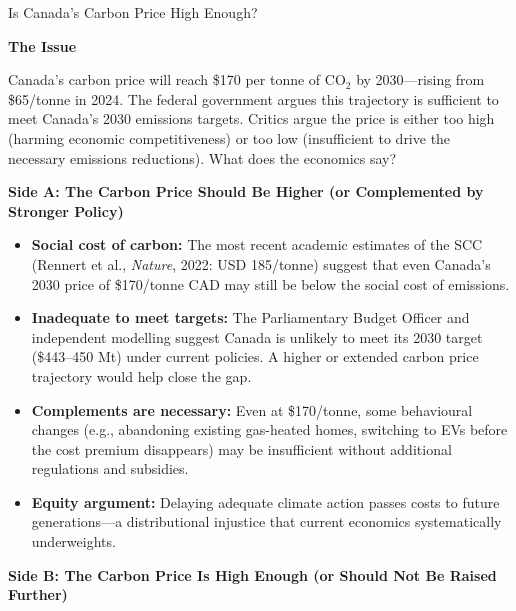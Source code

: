 \begin{policydebate}{Is Canada's Carbon Price High Enough?}

\textbf{The Issue}

Canada's carbon price will reach \$170 per tonne of CO$_2$ by 2030---rising from \$65/tonne in 2024. The federal government argues this trajectory is sufficient to meet Canada's 2030 emissions targets. Critics argue the price is either too high (harming economic competitiveness) or too low (insufficient to drive the necessary emissions reductions). What does the economics say?

\vspace{8pt}
\textbf{Side A: The Carbon Price Should Be Higher (or Complemented by Stronger Policy)}

\begin{itemize}
  \item \textbf{Social cost of carbon:} The most recent academic estimates of the SCC (Rennert et al., \textit{Nature}, 2022: USD 185/tonne) suggest that even Canada's 2030 price of \$170/tonne CAD may still be below the social cost of emissions.
  \item \textbf{Inadequate to meet targets:} The Parliamentary Budget Officer and independent modelling suggest Canada is unlikely to meet its 2030 target (\$443--450 Mt) under current policies. A higher or extended carbon price trajectory would help close the gap.
  \item \textbf{Complements are necessary:} Even at \$170/tonne, some behavioural changes (e.g., abandoning existing gas-heated homes, switching to EVs before the cost premium disappears) may be insufficient without additional regulations and subsidies.
  \item \textbf{Equity argument:} Delaying adequate climate action passes costs to future generations---a distributional injustice that current economics systematically underweights.
\end{itemize}

\textbf{Side B: The Carbon Price Is High Enough (or Should Not Be Raised Further)}


\end{policydebate}

